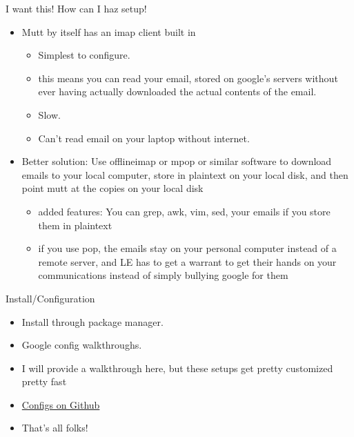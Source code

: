 \begin{frame}[t]{I want this! How can I haz setup!}
\begin{itemize}
    \item Mutt by itself has an imap client built in
        \begin{itemize}
            \item Simplest to configure.
            \item this means you can read your email, stored on google's servers without ever having actually downloaded the actual contents of the email.
            \item Slow.
            \item Can't read email on your laptop without internet.
        \end{itemize}
    \item Better solution: Use offlineimap or mpop or similar software to download emails to your local computer, store in plaintext on your local disk, and then point mutt at the copies on your local disk
        \begin{itemize}
            \item added features: You can grep, awk, vim, sed, your emails if you store them in plaintext
            \item if you use pop, the emails stay on your personal computer instead of a remote server, and LE has to get a warrant to get their hands on your communications instead of simply bullying google for them
            \end{itemize}
\end{itemize}
\end{frame}

\begin{frame}[t]{Install/Configuration}
\begin{itemize}
    \item Install through package manager.
    \item Google config walkthroughs.
    \item I will provide a walkthrough here, but these setups get pretty customized pretty fast
    \item \href{https://github.com/ACMLug/meetings/tree/master/meeting5-2014-10-06}{Configs on Github}
    \item That's all folks!
\end{itemize}
\end{frame}

